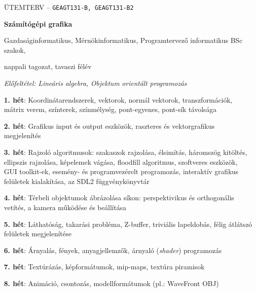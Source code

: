 \documentclass[a4paper,12pt]{article}
\begin{document}
\begin{center}
	{\Large ÜTEMTERV -- \texttt{GEAGT131-B, GEAGT131-B2}}

	\bigskip

	{\huge \textbf{Számítógépi grafika}}
	
	\medskip
	
	{\large Gazdaságinformatikus, Mérnökinformatikus, Programtervező informatikus BSc szakok,
	
	nappali tagozat, tavaszi félév}

	\medskip
	
	\textit{Előfeltétel: Lineáris algebra, Objektum orientált programozás}
\end{center}

\vskip 5mm

\noindent \textbf{1. hét}:
Koordinátarendszerek, vektorok, normál vektorok, transzformációk, mátrix verem, színterek, színmélység, pont-egyenes, pont-sík távolsága

\bigskip

\noindent \textbf{2. hét}:
Grafikus input és output eszközök, raszteres és vektorgrafikus megjelenítés

\bigskip

\noindent \textbf{3. hét}:
Rajzoló algoritmusok: szakaszok rajzolása, élsimítás, háromszög kitöltés, ellipszis rajzolása, képelemek vágása, floodfill algoritmus, szoftveres eszközök, GUI toolkit-ek, esemény- és programvezérelt programozás, interaktív grafikus felületek kialakítása, az SDL2 függvénykönyvtár

\bigskip

\noindent \textbf{4. hét}:
Térbeli objektumok ábrázolása síkon: perspektivikus és orthogonális vetítés, a kamera működése és beállítása

\bigskip

\noindent \textbf{5. hét}:
Láthatóság, takarási probléma, Z-buffer, triviális lapeldobás, félig átlátszó felületek megjelenítése

\bigskip

\noindent \textbf{6. hét}:
Árnyalás, fények, anyagjellemzők, árnyaló (\textit{shader}) programozás

\bigskip

\noindent \textbf{7. hét}:
Textúrázás, képformátumok, mip-maps, textúra piramisok

\bigskip

\noindent \textbf{8. hét}:
Animáció, csontozás, modellformátumok (pl.: WaveFront OBJ)

\bigskip
\end{document}
